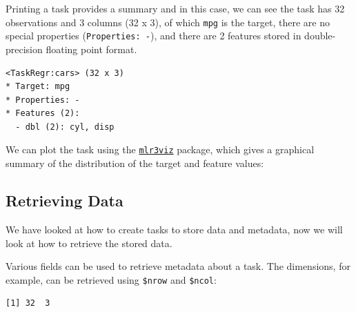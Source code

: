 Printing a task provides a summary and in this case, we can see the task
has 32 observations and 3 columns (32 x 3), of which \texttt{mpg} is the
target, there are no special properties (\texttt{Properties:\ -}), and
there are 2 features stored in double-precision floating point format.

\begin{Shaded}
\begin{Highlighting}[]
\end{Highlighting}
\end{Shaded}

\begin{verbatim}
<TaskRegr:cars> (32 x 3)
* Target: mpg
* Properties: -
* Features (2):
  - dbl (2): cyl, disp
\end{verbatim}

We can plot the task using the
\href{https://mlr3viz.mlr-org.com}{\texttt{mlr3viz}}
package, which gives a graphical summary of the distribution of the
target and feature values:

\begin{Shaded}
\begin{Highlighting}[]
 \NormalTok{)}
\end{Highlighting}
\end{Shaded}

\hypertarget{sec-retrieve-data}{%
\subsection{Retrieving Data}\label{sec-retrieve-data}}

We have looked at how to create tasks to store data and metadata, now we
will look at how to retrieve the stored data.

Various fields can be used to retrieve metadata about a task. The
dimensions, for example, can be retrieved using \texttt{\$nrow} and
\texttt{\$ncol}:

\begin{Shaded}
\begin{Highlighting}[]
\SpecialCharTok{$}\SpecialCharTok{$}
\end{Highlighting}
\end{Shaded}

\begin{verbatim}
[1] 32  3
\end{verbatim}

